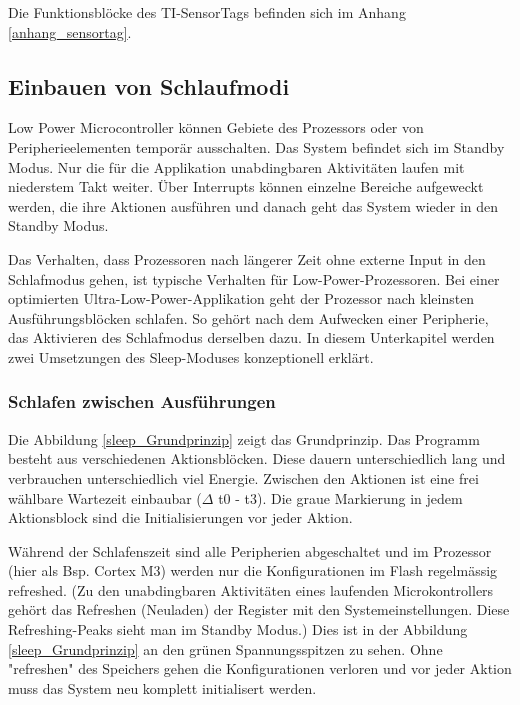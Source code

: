 Die Funktionsblöcke des TI-SensorTags befinden sich im Anhang \ref{anhang_sensortag}.

\subsection{Einbauen von Schlaufmodi}\label{pm_sleep} 

Low Power Microcontroller können Gebiete des Prozessors oder von Peripherieelementen temporär ausschalten. Das System befindet sich im Standby Modus. Nur die für die Applikation unabdingbaren Aktivitäten laufen mit niederstem Takt weiter. Über Interrupts können einzelne Bereiche aufgeweckt werden, die ihre Aktionen ausführen und danach geht das System wieder in den Standby Modus.

Das Verhalten, dass Prozessoren nach längerer Zeit ohne externe Input in den Schlafmodus gehen, ist typische Verhalten für Low-Power-Prozessoren. Bei einer optimierten Ultra-Low-Power-Applikation geht der Prozessor nach kleinsten Ausführungsblöcken schlafen. So gehört nach dem Aufwecken einer Peripherie, das Aktivieren des Schlafmodus derselben dazu. In diesem Unterkapitel werden zwei Umsetzungen des Sleep-Moduses konzeptionell erklärt.

\subsubsection{Schlafen zwischen Ausführungen}
\label{schlafen_theorie}

Die Abbildung \ref{sleep_Grundprinzip} zeigt das Grundprinzip. Das Programm besteht aus verschiedenen Aktionsblöcken. Diese dauern unterschiedlich lang und verbrauchen unterschiedlich viel Energie. Zwischen den Aktionen ist eine frei wählbare Wartezeit einbaubar ($\Delta$ t0 - t3). Die graue Markierung in jedem Aktionsblock sind die Initialisierungen vor jeder Aktion.

Während der Schlafenszeit sind alle Peripherien abgeschaltet und im Prozessor (hier als Bsp. Cortex M3) werden nur die Konfigurationen im Flash regelmässig \glqq refreshed\grqq. (Zu den unabdingbaren Aktivitäten eines laufenden Microkontrollers gehört das Refreshen (Neuladen) der Register mit den Systemeinstellungen. Diese Refreshing-Peaks sieht man im Standby Modus.)  Dies ist in der Abbildung \ref{sleep_Grundprinzip} an den grünen Spannungsspitzen zu sehen. Ohne "refreshen" des Speichers gehen die Konfigurationen verloren und vor jeder Aktion muss das System neu komplett initialisert werden.

